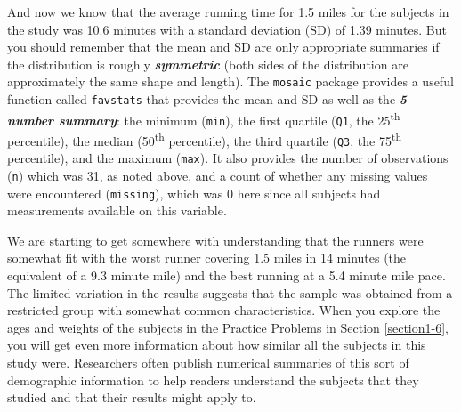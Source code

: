 \documentclass[
]{book}
\newenvironment{Shaded}{\begin{snugshade}}{\end{snugshade}}
\newcommand{\DecValTok}[1]{\textcolor[rgb]{0.00,0.00,0.81}{#1}}
\newcommand{\FloatTok}[1]{\textcolor[rgb]{0.00,0.00,0.81}{#1}}
\newcommand{\FunctionTok}[1]{\textcolor[rgb]{0.00,0.00,0.00}{#1}}
\newcommand{\NormalTok}[1]{#1}
\newcommand{\SpecialCharTok}[1]{\textcolor[rgb]{0.00,0.00,0.00}{#1}}
\begin{document}
\begin{Shaded}
\end{Shaded}

And now we know that the average running time for 1.5 miles for the subjects in the study was 10.6 minutes with a standard deviation (SD) of 1.39 minutes. But you should remember that the
mean and SD are only appropriate summaries if the distribution is roughly
\textbf{\emph{symmetric}} (both sides of the distribution are approximately the same shape and length). The
\texttt{mosaic} package provides a useful function called \texttt{favstats} that provides
the mean and SD as well as the \textbf{\emph{5 number summary}}: 
the minimum (\texttt{min}), the first quartile (\texttt{Q1}, the 25\textsuperscript{th} percentile),
the median (50\textsuperscript{th} percentile), the third quartile (\texttt{Q3}, the 75\textsuperscript{th}
percentile), and the maximum (\texttt{max}). It also provides the number of
observations (\texttt{n}) which was 31, as noted above, and a count of whether any
missing values were encountered (\texttt{missing}), which was 0 here since all
subjects had measurements available on this variable.

\begin{Shaded}
\end{Shaded}

\indent We are starting to get somewhere with understanding that the runners were
somewhat fit with the worst runner covering 1.5 miles in 14 minutes
(the equivalent of a 9.3 minute mile)
and the best running at a 5.4 minute mile pace. The limited variation in the
results suggests that the sample was obtained from a restricted group with
somewhat common characteristics. When you explore the ages and weights of the
subjects in the Practice Problems in Section \ref{section1-6}, you will get even more
information about how similar all the subjects in this study were. Researchers often publish numerical summaries of this sort of demographic information to help readers understand the subjects that they studied and that their results might apply to.
\end{document}
